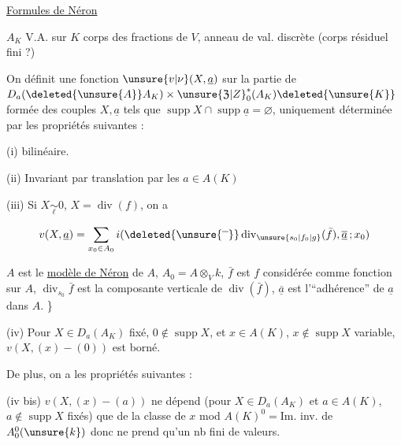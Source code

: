 \begin{center}\uline{Formules de Néron}\end{center}

$A_K$ V.A. sur $K$ corps des fractions de $V$, anneau
de val. discrète (corps résiduel fini  ?)

On définit une fonction $\unsure{v|\nu}(X,\underline a)$  sur la partie
de $D_a(\deleted{\unsure{A}}A_K)\times\unsure{\mathfrak Z|Z}_0^*(A_K)\deleted{\unsure{K}}$ formée des couples $X,\underline a$ tels
que $\operatorname{supp}X\cap\operatorname{supp}\underline a=\varnothing$, uniquement déterminée
par les propriétés suivantes :

(i) bilinéaire.

(ii) Invariant par translation par les $a\in A(K)$

(iii) Si $X\underset{\ell}{\sim}0$,   $X=\operatorname{div}(f)$, on a

\[
 v(X,\underline a)=\sum_{x_0\in A_0}i(\deleted{\unsure{\overline{\phantom{x}}}}\operatorname{div}_{\unsure{s_0|f_0|g}}(\bar f),\overline{\underline a}\,;x_0)
\]


$A$ est le \uline{modèle de Néron} de $A$, $A_0
=A\otimes_V k$, $\bar f$ est $f$ considérée comme fonction sur $A$,
 $\operatorname{div}_{s_0}\bar f$ est la composante verticale de $\operatorname{div}(\bar f)$,
$\overline{\underline a}$ est l’``adhérence'' de $\underline a$ dans $A$. \}

(iv) Pour $X\in D_a(A_K)$ fixé, $0\notin\operatorname{supp}X$, et
$x\in A(K)$, $x\notin\operatorname{supp}X$ variable, $v(X,(x)-(0))$ est
borné.

De plus, on a les propriétés suivantes :

(iv bis) $v(X,(x)-(a))$ ne dépend (pour $X\in D_a(A_K)$
 et $a\in A(K)$, $a\notin\operatorname{supp}X$ fixés) 
que de la classe de $x$ mod $A(K)^0={}$Im. inv. de $A_0^0(\unsure{k})$
donc ne prend qu’un nb fini de valeurs.
